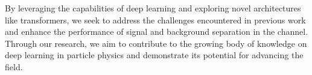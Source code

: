 By leveraging the capabilities of deep learning and exploring novel architectures like transformers, we seek to address
the challenges encountered in previous work and enhance the performance of signal and background separation in the
\lss channel. Through our research, we aim to contribute to the growing body of knowledge on deep learning in
particle physics and demonstrate its potential for advancing the field.


